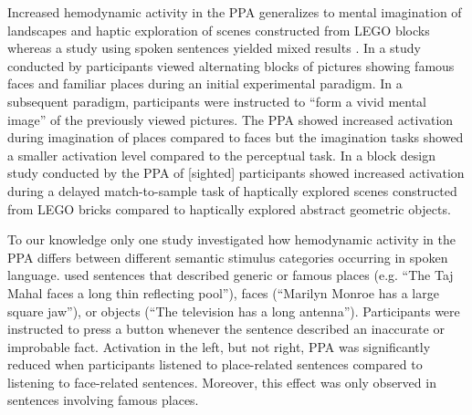 \documentclass[english]{article}
\begin{document}
Increased hemodynamic activity in the PPA generalizes to mental imagination of
landscapes \citep{ocraven2000mental} and haptic exploration of scenes
constructed from LEGO blocks \citep{wolbers2011modality} whereas a study using
spoken sentences yielded mixed results \citep{aziz2008modulation}.
In a study conducted by \cite{ocraven2000mental} participants viewed alternating
blocks of pictures showing famous faces and familiar places during an initial
experimental paradigm.
In a subsequent paradigm, participants were instructed to ``form a vivid mental
image'' of the previously viewed pictures.
The PPA showed increased activation during imagination of places compared to
faces but the imagination tasks showed a smaller activation level compared to
the perceptual task.
In a block design study conducted by \cite{wolbers2011modality} the PPA of
[sighted] participants showed increased activation during a delayed
match-to-sample task of haptically explored scenes constructed from LEGO bricks
compared to haptically explored abstract geometric objects.

To our knowledge only one study \citep{aziz2008modulation} investigated how
hemodynamic activity in the PPA differs between different semantic stimulus
categories occurring in spoken language.
\cite{aziz2008modulation} used sentences that described generic or famous places
(e.g. ``The Taj Mahal faces a long thin reflecting pool''), faces (``Marilyn
Monroe has a large square jaw''), or objects (``The television has a long
antenna'').
Participants were instructed to press a button whenever the sentence described
an inaccurate or improbable fact.
Activation in the left, but not right, PPA was significantly reduced when
participants listened to place-related sentences compared to listening to
face-related sentences. Moreover, this effect was only observed in sentences
involving famous places.
\end{document}
